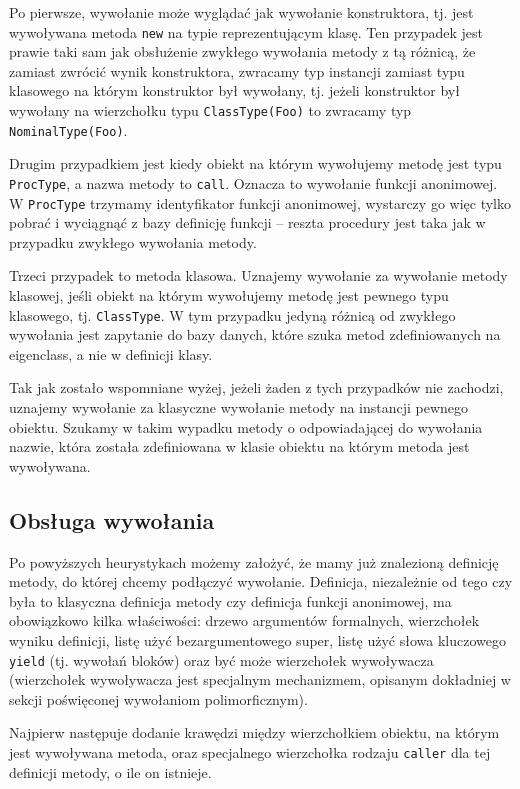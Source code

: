 \documentclass[declaration,shortabstract]{iithesis}
\begin{document}
Po pierwsze, wywołanie może wyglądać jak wywołanie konstruktora, tj. jest wywoływana metoda \texttt{new} na typie reprezentującym klasę. Ten przypadek jest prawie taki sam jak obsłużenie zwykłego wywołania metody z tą różnicą, że zamiast zwrócić wynik konstruktora, zwracamy typ instancji zamiast typu klasowego na którym konstruktor był wywołany, tj. jeżeli konstruktor był wywołany na wierzchołku typu \texttt{ClassType(Foo)} to zwracamy typ \texttt{NominalType(Foo)}.

Drugim przypadkiem jest kiedy obiekt na którym wywołujemy metodę jest typu \texttt{ProcType}, a nazwa metody to \texttt{call}. Oznacza to wywołanie funkcji anonimowej. W \texttt{ProcType} trzymamy identyfikator funkcji anonimowej, wystarczy go więc tylko pobrać i wyciągnąć z bazy definicję funkcji -- reszta procedury jest taka jak w przypadku zwykłego wywołania metody.

Trzeci przypadek to metoda klasowa. Uznajemy wywołanie za wywołanie metody klasowej, jeśli obiekt na którym wywołujemy metodę jest pewnego typu klasowego, tj. \texttt{ClassType}. W tym przypadku jedyną różnicą od zwykłego wywołania jest zapytanie do bazy danych, które szuka metod zdefiniowanych na eigenclass, a nie w definicji klasy.

Tak jak zostało wspomniane wyżej, jeżeli żaden z tych przypadków nie zachodzi, uznajemy wywołanie za klasyczne wywołanie metody na instancji pewnego obiektu. Szukamy w takim wypadku metody o odpowiadającej do wywołania nazwie, która została zdefiniowana w klasie obiektu na którym metoda jest wywoływana.

\subsection{Obsługa wywołania}

Po powyższych heurystykach możemy założyć, że mamy już znalezioną definicję metody, do której chcemy podłączyć wywołanie. Definicja, niezależnie od tego czy była to klasyczna definicja metody czy definicja funkcji anonimowej, ma obowiązkowo kilka właściwości: drzewo argumentów formalnych, wierzchołek wyniku definicji, listę użyć bezargumentowego super, listę użyć słowa kluczowego \texttt{yield} (tj. wywołań bloków) oraz być może wierzchołek wywoływacza (wierzchołek wywoływacza jest specjalnym mechanizmem, opisanym dokładniej w sekcji poświęconej wywołaniom polimorficznym).

Najpierw następuje dodanie krawędzi między wierzchołkiem obiektu, na którym jest wywoływana metoda, oraz specjalnego wierzchołka rodzaju \texttt{caller} dla tej definicji metody, o ile on istnieje.
\end{document}
